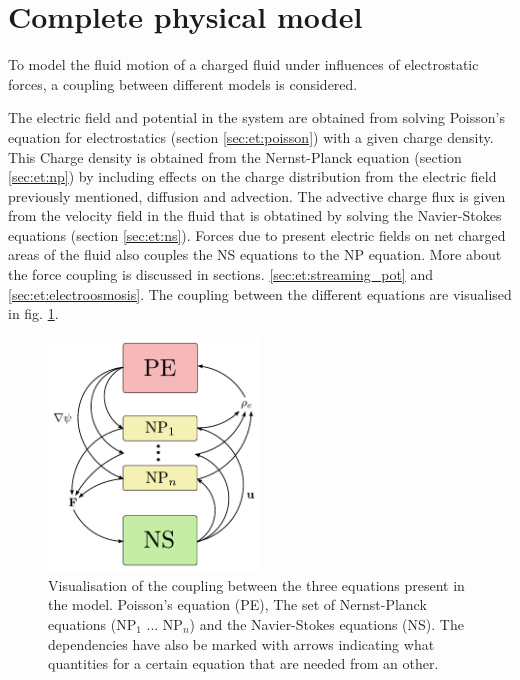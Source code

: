 \section{Complete physical model}\label{sec:et:coupling}
To model the fluid motion of a charged fluid under influences of
electrostatic forces, a coupling between different models is
considered.

The electric field and potential in the system are obtained from
solving Poisson's equation for electrostatics (section
\ref{sec:et:poisson}) with a given charge density. This Charge density
is obtained from the Nernst-Planck equation (section
\ref{sec:et:np}) by including effects on
the charge distribution from the electric field previously mentioned,
diffusion and advection. The advective charge flux is given from the
velocity field in the fluid that is obtatined by solving the
Navier-Stokes equations (section
\ref{sec:et:ns}). Forces due to present electric fields on net
charged areas of the fluid also couples the NS equations to the NP
equation. More about the force coupling is discussed in
sections. \ref{sec:et:streaming_pot} and
\ref{sec:et:electroosmosis}. The coupling between the different
equations are visualised in fig. \ref{fig:coupling}.

\begin{figure}
\begin{center}
\includegraphics[width=0.5\textwidth]{fig/coupling.pdf}
\end{center}
\caption{Visualisation of the coupling between the three equations
  present in the model. Poisson's equation (PE), The set of
  Nernst-Planck equations (NP$_1$ ... NP$_n$) and the Navier-Stokes
  equations (NS). The dependencies have also be marked with arrows
  indicating what quantities for a certain equation that are needed
  from an other.}
\label{fig:coupling}
\end{figure}


